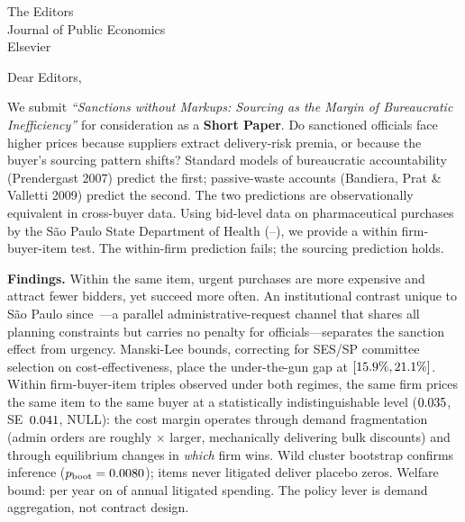 \documentclass[11pt,a4paper]{letter}
\date{\BPsubmissionDate}
\begin{document}
\begin{letter}{The Editors \\ Journal of Public Economics \\ Elsevier}

\opening{Dear Editors,}

We submit \emph{``Sanctions without Markups: Sourcing as the Margin of Bureaucratic Inefficiency''} for consideration as a \textbf{Short Paper}. Do sanctioned officials face higher prices because suppliers extract delivery-risk premia, or because the buyer's sourcing pattern shifts? Standard models of bureaucratic accountability (Prendergast 2007) predict the first; passive-waste accounts (Bandiera, Prat \& Valletti 2009) predict the second. The two predictions are observationally equivalent in cross-buyer data. Using bid-level data on \BPnPOIfull{} pharmaceutical purchases by the S\~ao Paulo State Department of Health (\BPsampleStartYear--\BPsampleEndYear), we provide a within firm-buyer-item test. The within-firm prediction fails; the sourcing prediction holds.

\smallskip\noindent\textbf{Findings.}
Within the same item, urgent purchases are \BPnegPctHeadline{} more expensive and attract \BPfirmsPctHeadline{} fewer bidders, yet succeed \BPsuccessPP{} more often. An institutional contrast unique to S\~ao Paulo since~\BPsampleStartYear---a parallel administrative-request channel that shares all planning constraints but carries no penalty for officials---separates the sanction effect from urgency. Manski-Lee bounds, correcting for SES/SP committee selection on cost-effectiveness, place the under-the-gun gap at $[15.9\%, 21.1\%]$. Within firm-buyer-item triples observed under both regimes, the same firm prices the same item to the same buyer at a statistically indistinguishable level ($0.035$, SE~$0.041$, NULL): the cost margin operates through demand fragmentation (admin orders are roughly \BPutgQtyAdminFoldPref$\times$ larger, mechanically delivering bulk discounts) and through equilibrium changes in \emph{which} firm wins. Wild cluster bootstrap confirms inference ($p_{\mathrm{boot}}=0.0080$); items never litigated deliver placebo zeros. Welfare bound: \BPwelfareBound{} per year on \BPwelfareBoundAnnualSpend{} of annual litigated spending. The policy lever is demand aggregation, not contract design.


\end{letter}
\end{document}
